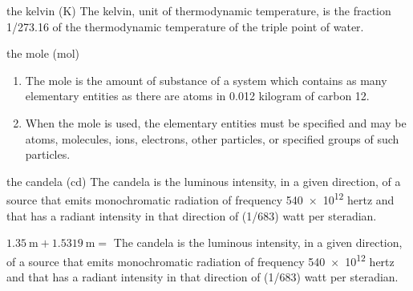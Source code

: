 \documentclass[avery5371,grid]{flashcards}
\begin{document}
\begin{flashcard}[Defintion]{the kelvin (K)}
\vspace{\fill}
The kelvin, unit of thermodynamic temperature, is the fraction 1/273.16 of the thermodynamic temperature of the triple point of water.
\vspace{\fill}
\end{flashcard}

\begin{flashcard}[Defintion]{the mole (mol)}
\vspace{\fill}
\begin{enumerate}
    \item  The mole is the amount of substance of a system which contains as many elementary entities as there are atoms in 0.012 kilogram of carbon 12.
    \item  When the mole is used, the elementary entities must be specified and may be atoms, molecules, ions, electrons, other particles, or specified groups of such particles.
\end{enumerate}
\vspace{\fill}
\end{flashcard}

\begin{flashcard}[Defintion]{the candela (cd)}
\vspace{\fill}
The candela is the luminous intensity, in a given direction, of a source that emits monochromatic radiation of frequency \num{540e12} hertz and that has a radiant intensity in that direction of (1/683) watt per steradian.
\vspace{\fill}
\end{flashcard}




\begin{flashcard}[Application]{$\SI{1.35}{\meter} + \SI{1.5319}{\meter} =$}
\vspace{\fill}
The candela is the luminous intensity, in a given direction, of a source that emits monochromatic radiation of frequency \num{540e12} hertz and that has a radiant intensity in that direction of (1/683) watt per steradian.
\vspace{\fill}
\end{flashcard}
\end{document}
